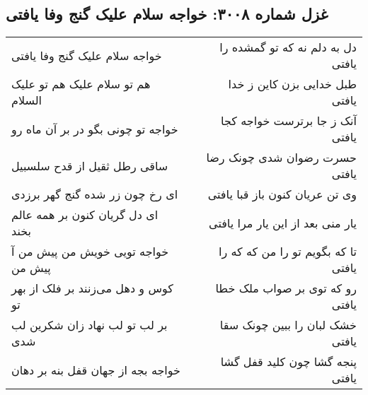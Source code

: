 \begin{center}
\section*{غزل شماره ۳۰۰۸: خواجه سلام علیک گنج وفا یافتی}
\label{sec:3008}
\begin{longtable}{l p{0.5cm} r}
خواجه سلام علیک گنج وفا یافتی
&&
دل به دلم نه که تو گمشده را یافتی
\\
هم تو سلام علیک هم تو علیک السلام
&&
طبل خدایی بزن کاین ز خدا یافتی
\\
خواجه تو چونی بگو در بر آن ماه رو
&&
آنک ز جا برترست خواجه کجا یافتی
\\
ساقی رطل ثقیل از قدح سلسبیل
&&
حسرت رضوان شدی چونک رضا یافتی
\\
ای رخ چون زر شده گنج گهر برزدی
&&
وی تن عریان کنون باز قبا یافتی
\\
ای دل گریان کنون بر همه عالم بخند
&&
یار منی بعد از این یار مرا یافتی
\\
خواجه تویی خویش من پیش من آ پیش من
&&
تا که بگویم تو را من که که را یافتی
\\
کوس و دهل می‌زنند بر فلک از بهر تو
&&
رو که توی بر صواب ملک خطا یافتی
\\
بر لب تو لب نهاد زان شکرین لب شدی
&&
خشک لبان را ببین چونک سقا یافتی
\\
خواجه بجه از جهان قفل بنه بر دهان
&&
پنجه گشا چون کلید قفل گشا یافتی
\\
\end{longtable}
\end{center}
